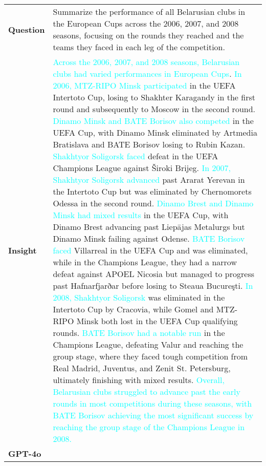 \begin{table*}[htbp]
\centering
\begin{small}
\begin{tabularx}{\textwidth}{%
>{\arraybackslash}p{}
>{\arraybackslash}X
}
\toprule
\multicolumn{2}{l}{\textbf{\eval Completeness : GPT-4o (score:} 68.97\textbf{) v.s. Qwen2-7B (score:} 9.84\textbf{)}} \\ \midrule
\textbf{Question}
& Summarize the performance of all Belarusian clubs in the European Cups across the 2006, 2007, and 2008 seasons, focusing on the rounds they reached and the teams they faced in each leg of the competition. \\ \midrule
\textbf{Insight}
& \textcolor{cyan}{Across the 2006, 2007, and 2008 seasons, Belarusian clubs had varied performances in European Cups}. \textcolor{cyan}{In 2006, MTZ-RIPO Minsk participated} in the UEFA Intertoto Cup, losing to Shakhter Karagandy in the first round and subsequently to Moscow in the second round. \textcolor{cyan}{Dinamo Minsk and BATE Borisov also competed} in the UEFA Cup, with Dinamo Minsk eliminated by Artmedia Bratislava and BATE Borisov losing to Rubin Kazan. \textcolor{cyan}{Shakhtyor Soligorsk faced} defeat in the UEFA Champions League against Široki Brijeg. \textcolor{cyan}{In 2007, Shakhtyor Soligorsk advanced} past Ararat Yerevan in the Intertoto Cup but was eliminated by Chernomorets Odessa in the second round. \textcolor{cyan}{Dinamo Brest and Dinamo Minsk had mixed results} in the UEFA Cup, with Dinamo Brest advancing past Liepājas Metalurgs but Dinamo Minsk failing against Odense. \textcolor{cyan}{BATE Borisov faced} Villarreal in the UEFA Cup and was eliminated, while in the Champions League, they had a narrow defeat against APOEL Nicosia but managed to progress past Hafnarfjarðar before losing to Steaua Bucureşti. \textcolor{cyan}{In 2008, Shakhtyor Soligorsk} was eliminated in the Intertoto Cup by Cracovia, while Gomel and MTZ-RIPO Minsk both lost in the UEFA Cup qualifying rounds. \textcolor{cyan}{BATE Borisov had a notable run} in the Champions League, defeating Valur and reaching the group stage, where they faced tough competition from Real Madrid, Juventus, and Zenit St. Petersburg, ultimately finishing with mixed results. \textcolor{cyan}{Overall, Belarusian clubs struggled to advance past the early rounds in most competitions during these seasons, with BATE Borisov achieving the most significant success by reaching the group stage of the Champions League in 2008.} \\ \midrule
\textbf{GPT-4o}

\end{tabularx}
\end{small}
\end{table*}
